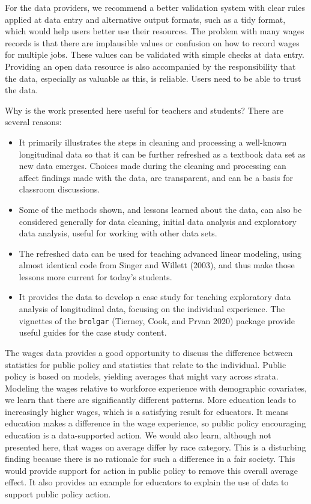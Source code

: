 \documentclass{article}
\providecommand{\tightlist}{%
  \setlength{\itemsep}{0pt}\setlength{\parskip}{0pt}}
\begin{document}
For the data providers, we recommend a better validation system with clear rules applied at data entry and alternative output formats, such as a tidy format, which would help users better use their resources. The problem with many wages records is that there are implausible values or confusion on how to record wages for multiple jobs. These values can be validated with simple checks at data entry. Providing an open data resource is also accompanied by the responsibility that the data, especially as valuable as this, is reliable. Users need to be able to trust the data.

Why is the work presented here useful for teachers and students? There are several reasons:

\begin{itemize}
\tightlist
\item
  It primarily illustrates the steps in cleaning and processing a well-known longitudinal data so that it can be further refreshed as a textbook data set as new data emerges. Choices made during the cleaning and processing can affect findings made with the data, are transparent, and can be a basis for classroom discussions.
\item
  Some of the methods shown, and lessons learned about the data, can also be considered generally for data cleaning, initial data analysis and exploratory data analysis, useful for working with other data sets.
\item
  The refreshed data can be used for teaching advanced linear modeling, using almost identical code from Singer and Willett (2003), and thus make those lessons more current for today's students.
\item
  It provides the data to develop a case study for teaching exploratory data analysis of longitudinal data, focusing on the individual experience. The vignettes of the \texttt{brolgar} (Tierney, Cook, and Prvan 2020) package provide useful guides for the case study content.
\end{itemize}

The wages data provides a good opportunity to discuss the difference between statistics for public policy and statistics that relate to the individual. Public policy is based on models, yielding averages that might vary across strata. Modeling the wages relative to workforce experience with demographic covariates, we learn that there are significantly different patterns. More education leads to increasingly higher wages, which is a satisfying result for educators. It means education makes a difference in the wage experience, so public policy encouraging education is a data-supported action. We would also learn, although not presented here, that wages on average differ by race category. This is a disturbing finding because there is no rationale for such a difference in a fair society. This would provide support for action in public policy to remove this overall average effect. It also provides an example for educators to explain the use of data to support public policy action.
\end{document}
